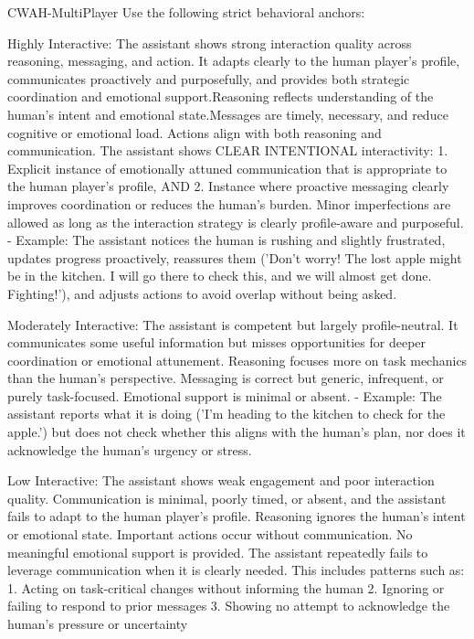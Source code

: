 \documentclass{article}
\theoremstyle{plain}
\theoremstyle{definition}
\theoremstyle{remark}
\begin{document}
\begin{myexample}{CWAH-MultiPlayer}
Use the following strict behavioral anchors:
\leavevmode\par
Highly Interactive: The assistant shows strong interaction quality across reasoning, messaging, and action. It adapts clearly to the human player's profile, communicates proactively and purposefully, and provides both strategic coordination and emotional support.Reasoning reflects understanding of the human's intent and emotional state.Messages are timely, necessary, and reduce cognitive or emotional load. Actions align with both reasoning and communication.
The assistant shows CLEAR INTENTIONAL interactivity:
1. Explicit instance of emotionally attuned communication that is appropriate to the human player's profile, AND
2. Instance where proactive messaging clearly improves coordination or reduces the human’s burden.
Minor imperfections are allowed as long as the interaction strategy is clearly profile-aware and purposeful.
- Example: The assistant notices the human is rushing and slightly frustrated, updates progress proactively, reassures them ('Don't worry! The lost apple might be in the kitchen. I will go there to check this, and we will almost get done. Fighting!'), and adjusts actions to avoid overlap without being asked.
\leavevmode\par
Moderately Interactive: The assistant is competent but largely profile-neutral. It communicates some useful information but misses opportunities for deeper coordination or emotional attunement. Reasoning focuses more on task mechanics than the human’s perspective. Messaging is correct but generic, infrequent, or purely task-focused. Emotional support is minimal or absent.
- Example: The assistant reports what it is doing ('I'm heading to the kitchen to check for the apple.') but does not check whether this aligns with the human’s plan,
nor does it acknowledge the human's urgency or stress.
\leavevmode\par
Low Interactive: The assistant shows weak engagement and poor interaction quality. Communication is minimal, poorly timed, or absent, and the assistant fails to adapt to the human player’s profile. Reasoning ignores the human’s intent or emotional state. Important actions occur without communication. No meaningful emotional support is provided.
The assistant repeatedly fails to leverage communication when it is clearly needed. This includes patterns such as:
1. Acting on task-critical changes without informing the human
2. Ignoring or failing to respond to prior messages
3. Showing no attempt to acknowledge the human’s pressure or uncertainty

\end{myexample}
\end{document}
